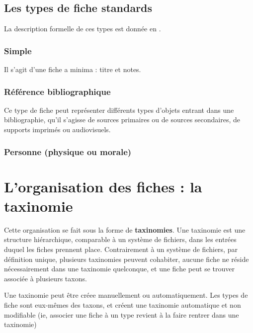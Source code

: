 \documentclass[11pt,french]{article}
\begin{document}
\subsection{Les types de fiche standards\label{sub:Types}}

La description formelle de ces types est donnée en .


\subsubsection{Simple}

Il s'agit d'une fiche a minima : titre et notes.


\subsubsection{Référence bibliographique}

Ce type de fiche peut représenter différents types d'objets entrant
dans une bibliographie, qu'il s'agisse de sources primaires ou de
sources secondaires, de supports imprimés ou audiovisuels. 


\subsubsection{Personne (physique ou morale)}


\section{L'organisation des fiches : la taxinomie}

Cette organisation se fait sous la forme de\textbf{ taxinomies}. Une
taxinomie est une structure hiérarchique, comparable à un système
de fichiers, dans les entrées duquel les fiches prennent place. Contrairement
à un système de fichiers, par définition unique, plusieurs taxinomies
peuvent cohabiter, aucune fiche ne réside nécessairement dans une
taxinomie quelconque, et une fiche peut se trouver associée à plusieurs
taxons.

Une taxinomie peut être créee manuellement ou automatiquement. Les
types de fiche sont eux-mêmes des taxons, et créent une taxinomie
automatique et non modifiable (ie, associer une fiche à un type revient
à la faire rentrer dans une taxinomie)
\end{document}
